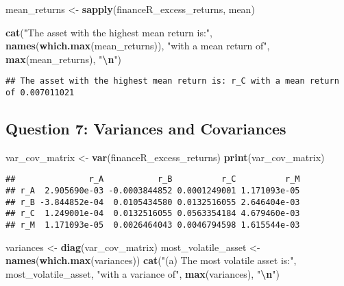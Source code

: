\documentclass[
]{article}
\newenvironment{Shaded}{\begin{snugshade}}{\end{snugshade}}
\newcommand{\FunctionTok}[1]{\textcolor[rgb]{0.13,0.29,0.53}{\textbf{#1}}}
\newcommand{\NormalTok}[1]{#1}
\newcommand{\OtherTok}[1]{\textcolor[rgb]{0.56,0.35,0.01}{#1}}
\newcommand{\SpecialCharTok}[1]{\textcolor[rgb]{0.81,0.36,0.00}{\textbf{#1}}}
\newcommand{\StringTok}[1]{\textcolor[rgb]{0.31,0.60,0.02}{#1}}
\begin{document}
\begin{Shaded}
\begin{Highlighting}[]
\NormalTok{mean\_returns }\OtherTok{\textless{}{-}} \FunctionTok{sapply}\NormalTok{(financeR\_excess\_returns, mean)}

\FunctionTok{cat}\NormalTok{(}\StringTok{"The asset with the highest mean return is:"}\NormalTok{, }\FunctionTok{names}\NormalTok{(}\FunctionTok{which.max}\NormalTok{(mean\_returns)), }\StringTok{"with a mean return of"}\NormalTok{, }\FunctionTok{max}\NormalTok{(mean\_returns), }\StringTok{"}\SpecialCharTok{\textbackslash{}n}\StringTok{"}\NormalTok{)}
\end{Highlighting}
\end{Shaded}

\begin{verbatim}
## The asset with the highest mean return is: r_C with a mean return of 0.007011021
\end{verbatim}

\hypertarget{question-7-variances-and-covariances}{%
\subsection{Question 7: Variances and
Covariances}\label{question-7-variances-and-covariances}}

\begin{Shaded}
\begin{Highlighting}[]
\NormalTok{var\_cov\_matrix }\OtherTok{\textless{}{-}} \FunctionTok{var}\NormalTok{(financeR\_excess\_returns)}
\FunctionTok{print}\NormalTok{(var\_cov\_matrix)}
\end{Highlighting}
\end{Shaded}

\begin{verbatim}
##               r_A           r_B          r_C          r_M
## r_A  2.905690e-03 -0.0003844852 0.0001249001 1.171093e-05
## r_B -3.844852e-04  0.0105434580 0.0132516055 2.646404e-03
## r_C  1.249001e-04  0.0132516055 0.0563354184 4.679460e-03
## r_M  1.171093e-05  0.0026464043 0.0046794598 1.615544e-03
\end{verbatim}

\begin{Shaded}
\begin{Highlighting}[]
\NormalTok{variances }\OtherTok{\textless{}{-}} \FunctionTok{diag}\NormalTok{(var\_cov\_matrix)}
\NormalTok{most\_volatile\_asset }\OtherTok{\textless{}{-}} \FunctionTok{names}\NormalTok{(}\FunctionTok{which.max}\NormalTok{(variances))}
\FunctionTok{cat}\NormalTok{(}\StringTok{"(a) The most volatile asset is:"}\NormalTok{, most\_volatile\_asset, }\StringTok{"with a variance of"}\NormalTok{, }\FunctionTok{max}\NormalTok{(variances), }\StringTok{"}\SpecialCharTok{\textbackslash{}n}\StringTok{"}\NormalTok{)}
\end{Highlighting}
\end{Shaded}
\end{document}
